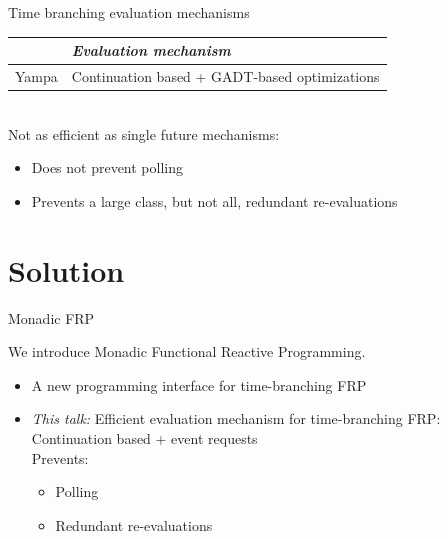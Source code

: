 \documentclass{beamer}
\begin{document}
\begin{frame}{Time branching evaluation mechanisms}
\begin{tabular}{l l}
 & \emph{Evaluation mechanism}  \\
\hline
Yampa & Continuation based + GADT-based optimizations  \\
\end{tabular}\\
\vspace{0.2cm}
Not as efficient as single future mechanisms: 
\begin{itemize}
\item Does not prevent polling
\item Prevents a large class, but not all, redundant re-evaluations
\end{itemize}
\end{frame}
\section{Solution}

\begin{frame}{Monadic FRP}

We introduce Monadic Functional Reactive Programming.
\begin{itemize}
\item A new programming interface for time-branching  FRP
\item \emph{This talk:} Efficient evaluation mechanism for time-branching FRP: \\
 Continuation based + event requests\\
Prevents:
\begin{itemize}
\item Polling
\item Redundant re-evaluations
\end{itemize}
\end{itemize}
\end{frame}

\newlength{\tmathindenta}
\setlength{\tmathindenta}{\mathindent}
\setlength{\mathindent}{0.05cm}
\end{document}

